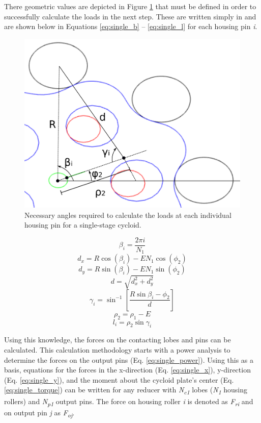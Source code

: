 There geometric values are depicted in Figure \ref{fig:single_loads_angles} that must be defined in order to successfully calculate the loads in the next step. These are written simply in \cite{ref:hwang_geometry} and are shown below in Equations \ref{eq:single_b} -- \ref{eq:single_l} for each housing pin \textit{i}. 

\begin{figure}[!b]
   \centering
   \includegraphics[width=0.6\linewidth]{fig/single_loads_angles}
   \caption{Necessary angles required to calculate the loads at each individual housing pin for a single-stage cycloid.}
   \label{fig:single_loads_angles}
\end{figure}

\begin{equation} \label{eq:single_b}
\beta_i = \frac{2\pi i}{N_1}
\end{equation}
\begin{equation} \label{eq:single_d_x}
d_x = R \cos(\beta_i) - E N_1 \cos(\phi_2)
\end{equation}
\begin{equation} \label{eq:single_d_y}
d_y = R\sin(\beta_i) - E N_1 \sin(\phi_2)
\end{equation}
\begin{equation} \label{eq:single_d}
d = \sqrt{d_x^2 + d_y^2}
\end{equation}
\begin{equation} \label{eq:single_gamma}
\gamma_i = \sin^{-1}\left[{\frac{R \sin{\beta_i - \phi_2}}{d}}\right]
\end{equation}
\begin{equation} \label{eq:single_rho2}
\rho_2 = \rho_1 - E
\end{equation}
\begin{equation} \label{eq:single_l}
l_i = \rho_2 \sin{\gamma_i}
\end{equation}

Using this knowledge, the forces on the contacting lobes and pins can be calculated. This calculation methodology starts with a power analysis to determine the forces on the output pins (Eq. \ref{eq:single_power}). Using this as a basis, equations for the forces in the x-direction (Eq. \ref{eq:single_x}), y-direction (Eq. \ref{eq:single_y}), and the moment about the cycloid plate's center (Eq. \ref{eq:single_torque}) can be written for any reducer with \textit{N\textsubscript{c1}} lobes (\textit{N\textsubscript{1}} housing rollers) and \textit{N\textsubscript{p1}} output pins. The force on housing roller \textit{i} is denoted as \textit{F\textsubscript{ri}} and on output pin \textit{j} as \textit{F\textsubscript{oj}}.

